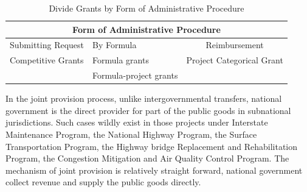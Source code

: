 \begin{table}[htbp]
  \centering
  \caption{Divide Grants by Form of Administrative Procedure}
  \begin{tabular}{clc}
    \toprule
    \multicolumn{3}{c}{Form of Administrative Procedure}                                                                                                     \\
    \midrule
    \multicolumn{1}{p{9.645em}}{ Submitting Request} & \multicolumn{1}{p{10.285em}}{               By Formula} & \multicolumn{1}{p{10.855em}}{Reimbursement} \\
    \midrule
    \multicolumn{1}{l}{Competitive Grants}           & Formula grants                                          & Project Categorical Grant                   \\
                                                     & Formula-project grants                                  &                                             \\
    \bottomrule
  \end{tabular}%
  \label{Table 1.4}%
\end{table}%

In the joint provision process, unlike intergovernmental transfers, national government is the direct provider for part of the public goods in subnational jurisdictions. Such cases wildly exist in those projects under Interstate Maintenance Program, the National Highway Program, the Surface Transportation Program, the Highway bridge Replacement and Rehabilitation Program, the Congestion Mitigation and Air Quality Control Program. The mechanism of joint provision is relatively straight forward, national government collect revenue and supply the public goods directly.

